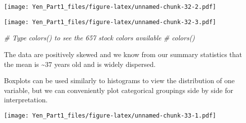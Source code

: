 \documentclass[
]{article}
\newenvironment{Shaded}{\begin{snugshade}}{\end{snugshade}}
\newcommand{\AttributeTok}[1]{\textcolor[rgb]{0.77,0.63,0.00}{#1}}
\newcommand{\CommentTok}[1]{\textcolor[rgb]{0.56,0.35,0.01}{\textit{#1}}}
\newcommand{\DecValTok}[1]{\textcolor[rgb]{0.00,0.00,0.81}{#1}}
\newcommand{\FunctionTok}[1]{\textcolor[rgb]{0.00,0.00,0.00}{#1}}
\newcommand{\NormalTok}[1]{#1}
\newcommand{\SpecialCharTok}[1]{\textcolor[rgb]{0.00,0.00,0.00}{#1}}
\newcommand{\StringTok}[1]{\textcolor[rgb]{0.31,0.60,0.02}{#1}}
\begin{document}
\texttt{[image: Yen\_Part1\_files/figure-latex/unnamed-chunk-32-2.pdf]}

\begin{Shaded}
\end{Shaded}

\texttt{[image: Yen\_Part1\_files/figure-latex/unnamed-chunk-32-3.pdf]}

\begin{Shaded}
\begin{Highlighting}[]
\CommentTok{\# Type colors() to see the 657 stock colors available }
\CommentTok{\# colors()}
\end{Highlighting}
\end{Shaded}

The data are positively skewed and we know from our summary statistics
that the mean is \textasciitilde37 years old and is widely dispersed.

Boxplots can be used similarly to histograms to view the distribution of
one variable, but we can conveniently plot categorical groupings side by
side for interpretation.

\begin{Shaded}
\end{Shaded}

\texttt{[image: Yen\_Part1\_files/figure-latex/unnamed-chunk-33-1.pdf]}

\begin{Shaded}
\end{Shaded}
\end{document}
